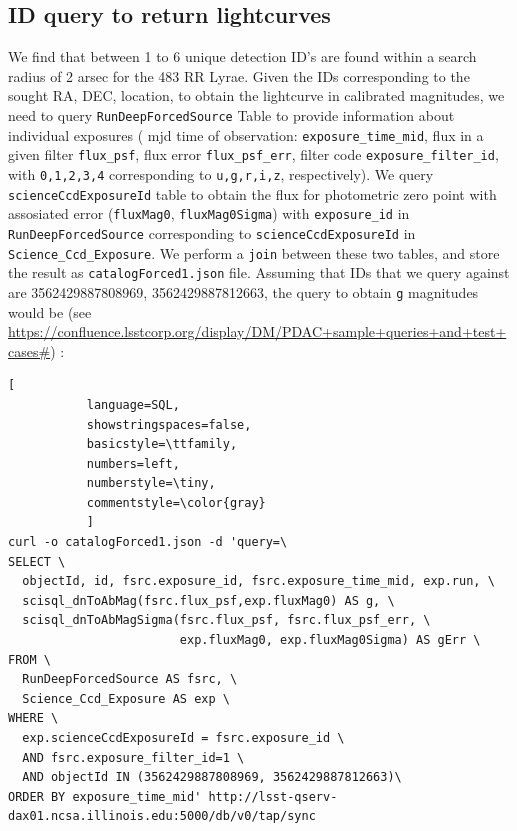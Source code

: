 \documentclass[fleqn,usenatbib]{mnras} %
\begin{document}
\subsection{ID query to return lightcurves}
We find that between 1 to 6 unique detection ID's are found within a search radius of 2 arsec for the 483 RR Lyrae.  Given the IDs corresponding to the sought RA, DEC, location, to obtain the lightcurve in calibrated magnitudes, we need to query \verb|RunDeepForcedSource| Table to provide information about individual exposures ( mjd time of observation: \verb|exposure_time_mid|, flux in a given filter \verb|flux_psf|, flux error \verb|flux_psf_err|, filter code \verb|exposure_filter_id|, with  \verb|0,1,2,3,4| corresponding to  \verb|u,g,r,i,z|, respectively).  We query \verb|scienceCcdExposureId| table to obtain the flux for photometric zero point with assosiated error (\verb|fluxMag0|, \verb|fluxMag0Sigma|)  with  \verb|exposure_id| in \verb|RunDeepForcedSource| corresponding to \verb|scienceCcdExposureId| in \verb|Science_Ccd_Exposure|. We perform a \verb|join| between these two tables, and store the result as   \verb|catalogForced1.json| file. 
Assuming that IDs that we query against are 3562429887808969, 3562429887812663, the query to obtain \verb|g| magnitudes would be (see  \url{https://confluence.lsstcorp.org/display/DM/PDAC+sample+queries+and+test+cases#}) :


\begin{lstlisting}[
           language=SQL,
           showstringspaces=false,
           basicstyle=\ttfamily,
           numbers=left,
           numberstyle=\tiny,
           commentstyle=\color{gray}
           ]
curl -o catalogForced1.json -d 'query=\
SELECT \
  objectId, id, fsrc.exposure_id, fsrc.exposure_time_mid, exp.run, \
  scisql_dnToAbMag(fsrc.flux_psf,exp.fluxMag0) AS g, \
  scisql_dnToAbMagSigma(fsrc.flux_psf, fsrc.flux_psf_err, \
                        exp.fluxMag0, exp.fluxMag0Sigma) AS gErr \
FROM \
  RunDeepForcedSource AS fsrc, \
  Science_Ccd_Exposure AS exp \
WHERE \
  exp.scienceCcdExposureId = fsrc.exposure_id \
  AND fsrc.exposure_filter_id=1 \
  AND objectId IN (3562429887808969, 3562429887812663)\
ORDER BY exposure_time_mid' http://lsst-qserv-dax01.ncsa.illinois.edu:5000/db/v0/tap/sync

\end{lstlisting}




\bsp	%
\label{lastpage}
\end{document}
